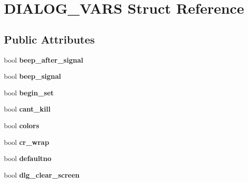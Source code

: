 \hypertarget{struct_d_i_a_l_o_g___v_a_r_s}{}\section{D\+I\+A\+L\+O\+G\+\_\+\+V\+A\+RS Struct Reference}
\label{struct_d_i_a_l_o_g___v_a_r_s}
\subsection*{Public Attributes}
\begin{DoxyCompactItemize}
\item 
bool {\bfseries beep\+\_\+after\+\_\+signal}\hypertarget{struct_d_i_a_l_o_g___v_a_r_s_afbb0cc2ef82132351cc87825ef8759ae}{}\label{struct_d_i_a_l_o_g___v_a_r_s_afbb0cc2ef82132351cc87825ef8759ae}

\item 
bool {\bfseries beep\+\_\+signal}\hypertarget{struct_d_i_a_l_o_g___v_a_r_s_a1d5c3a8d770644d457ef542bafb773ee}{}\label{struct_d_i_a_l_o_g___v_a_r_s_a1d5c3a8d770644d457ef542bafb773ee}

\item 
bool {\bfseries begin\+\_\+set}\hypertarget{struct_d_i_a_l_o_g___v_a_r_s_a6afa1f616d0a89bb5d1ba82db2edb9fd}{}\label{struct_d_i_a_l_o_g___v_a_r_s_a6afa1f616d0a89bb5d1ba82db2edb9fd}

\item 
bool {\bfseries cant\+\_\+kill}\hypertarget{struct_d_i_a_l_o_g___v_a_r_s_ac3c68ae6bb9f78ecd267dac3f943ec6d}{}\label{struct_d_i_a_l_o_g___v_a_r_s_ac3c68ae6bb9f78ecd267dac3f943ec6d}

\item 
bool {\bfseries colors}\hypertarget{struct_d_i_a_l_o_g___v_a_r_s_ae9ed345a342096b3047dad85bcfd751d}{}\label{struct_d_i_a_l_o_g___v_a_r_s_ae9ed345a342096b3047dad85bcfd751d}

\item 
bool {\bfseries cr\+\_\+wrap}\hypertarget{struct_d_i_a_l_o_g___v_a_r_s_aafb24d144c56d2b5775a0e8519cce935}{}\label{struct_d_i_a_l_o_g___v_a_r_s_aafb24d144c56d2b5775a0e8519cce935}

\item 
bool {\bfseries defaultno}\hypertarget{struct_d_i_a_l_o_g___v_a_r_s_a712af2b06bb67f8a4d217c79805819fc}{}\label{struct_d_i_a_l_o_g___v_a_r_s_a712af2b06bb67f8a4d217c79805819fc}

\item 
bool {\bfseries dlg\+\_\+clear\+\_\+screen}\hypertarget{struct_d_i_a_l_o_g___v_a_r_s_a9d5bd43cc4383604aa23afabc0ba079c}{}\label{struct_d_i_a_l_o_g___v_a_r_s_a9d5bd43cc4383604aa23afabc0ba079c}


\end{DoxyCompactItemize}
